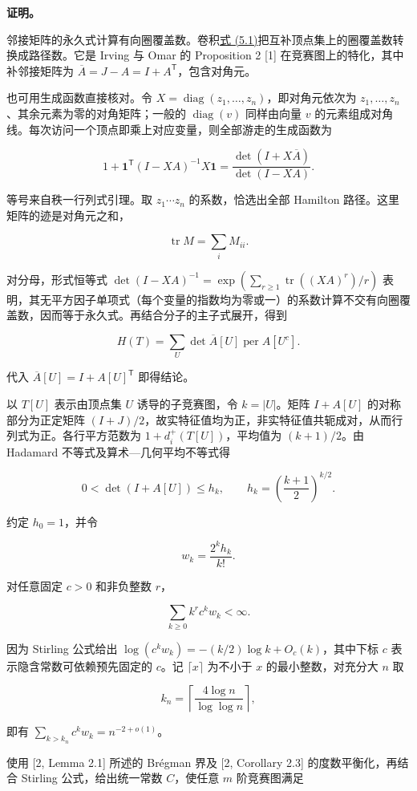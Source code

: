 \documentclass[11pt,a4paper]{article}
\begin{document}
\textbf{证明。}

邻接矩阵的永久式计算有向圈覆盖数。卷积\hyperref[eq-path-convolution]{式 (5.1)}把互补顶点集上的圈覆盖数转换成路径数。它是 Irving 与 Omar 的 Proposition 2 {[}1{]} 在竞赛图上的特化，其中补邻接矩阵为 \(\overline A=J-A=I+A^{\mathsf T}\)，包含对角元。

也可用生成函数直接核对。令 \(X=\operatorname{diag}(z_1,\ldots,z_n)\)，即对角元依次为 \(z_1,\ldots,z_n\)、其余元素为零的对角矩阵；一般的 \(\operatorname{diag}(v)\) 同样由向量 \(v\) 的元素组成对角线。每次访问一个顶点即乘上对应变量，则全部游走的生成函数为

\[1+\mathbf1^{\mathsf T}(I-XA)^{-1}X\mathbf1
=\frac{\det(I+X\overline A)}{\det(I-XA)}.\]

等号来自秩一行列式引理。取 \(z_1\cdots z_n\) 的系数，恰选出全部 Hamilton 路径。这里矩阵的迹是对角元之和，

\[\operatorname{tr}M=\sum_iM_{ii}.\]

对分母，形式恒等式 \(\det(I-XA)^{-1}=\exp(\sum_{r\ge1}\operatorname{tr}((XA)^r)/r)\) 表明，其无平方因子单项式（每个变量的指数均为零或一）的系数计算不交有向圈覆盖数，因而等于永久式。再结合分子的主子式展开，得到

\[H(T)=\sum_U\det\overline A[U]\operatorname{per}A[U^c].\]

代入 \(\overline A[U]=I+A[U]^{\mathsf T}\) 即得结论。

以 \(T[U]\) 表示由顶点集 \(U\) 诱导的子竞赛图，令 \(k=|U|\)。矩阵 \(I+A[U]\) 的对称部分为正定矩阵 \((I+J)/2\)，故实特征值均为正，非实特征值共轭成对，从而行列式为正。各行平方范数为 \(1+d_i^+(T[U])\)，平均值为 \((k+1)/2\)。由 Hadamard 不等式及算术---几何平均不等式得

\[0<\det(I+A[U])\le h_k,\qquad h_k=\left(\frac{k+1}{2}\right)^{k/2}.\]

约定 \(h_0=1\)，并令

\[w_k=\frac{2^k h_k}{k!}.\]

对任意固定 \(c>0\) 和非负整数 \(r\)，

\[\sum_{k\ge0}k^r c^k w_k<\infty.\]

因为 Stirling 公式给出 \(\log(c^kw_k)=-(k/2)\log k+O_c(k)\)，其中下标 \(c\) 表示隐含常数可依赖预先固定的 \(c\)。记 \(\lceil x\rceil\) 为不小于 \(x\) 的最小整数，对充分大 \(n\) 取

\[k_n=\left\lceil\frac{4\log n}{\log\log n}\right\rceil,\]

即有 \(\sum_{k>k_n}c^kw_k=n^{-2+o(1)}\)。

使用 {[}2, Lemma 2.1{]} 所述的 Brégman 界及 {[}2, Corollary 2.3{]} 的度数平衡化，再结合 Stirling 公式，给出统一常数 \(C\)，使任意 \(m\) 阶竞赛图满足
\end{document}
